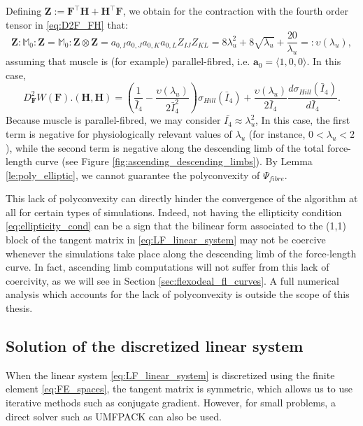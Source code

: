 \documentclass{sfuthesis}
\numberwithin{equation}{section}
\numberwithin{figure}{chapter}
\numberwithin{table}{chapter}
\theoremstyle{definition}
\def\*#1{{\mathbf{#1}}} %
\newcommand{\I}{{\bar{I}}}
\begin{document}
Defining $\*Z := \*F^\top \*H + \*H^\top \*F$, we obtain for the contraction with the fourth order tensor in \eqref{eq:D2F_FH} that:
\begin{equation}
    \*Z : \mathbb{M}_0 : \*Z = \mathbb{M}_0 : \*Z \otimes \*Z = a_{0,I} a_{0,J} a_{0,K} a_{0,L} Z_{IJ} Z_{KL} = 8\lambda_u^2 + 8 \sqrt{\lambda_u} + \dfrac{20}{\lambda_u} =: \upsilon(\lambda_u),
\end{equation}
assuming that muscle is (for example) parallel-fibred, i.e. $\*a_0 = \langle 1,0,0 \rangle$. In this case,
\begin{equation}
    D_{\*F}^2 W(\*F).(\*H, \*H)  = \left(\dfrac{1}{\I_4} - \dfrac{\upsilon(\lambda_u)}{2\I_4^2} \right)\sigma_{Hill}(\I_4)  + \dfrac{\upsilon(\lambda_u)}{2\I_4} \dfrac{d \sigma_{Hill}(\I_4)}{d\I_4}.
\end{equation}
Because muscle is parallel-fibred, we may consider $\bar{I_4} \approx \lambda_u^2$, In this case, the first term is negative for physiologically relevant values of $\lambda_u$ (for instance, $0 < \lambda_u < 2$), while the second term  is negative along the descending limb of the total force-length curve (see Figure \ref{fig:ascending_descending_limbs}). By Lemma \ref{le:poly_elliptic}, we cannot guarantee the polyconvexity of $\Psi_{fibre}$.

This lack of polyconvexity can directly hinder the convergence of the algorithm at all for certain types of simulations. Indeed, not having the ellipticity condition \eqref{eq:ellipticity_cond} can be a sign that the bilinear form associated to the (1,1) block of the tangent matrix in \eqref{eq:LF_linear_system} may not be coercive whenever the simulations take place along the descending limb of the force-length curve. In fact, ascending limb computations will not suffer from this lack of coercivity, as we will see in Section \ref{sec:flexodeal_fl_curves}. A full numerical analysis which accounts for the lack of polyconvexity is outside the scope of this thesis.


\subsection{Solution of the discretized linear system}

When the linear system \eqref{eq:LF_linear_system} is discretized using the finite element \eqref{eq:FE_spaces}, the tangent matrix is symmetric, which allows us to use iterative methods such as conjugate gradient. However, for small problems, a direct solver such as UMFPACK can also be used.
\end{document}
